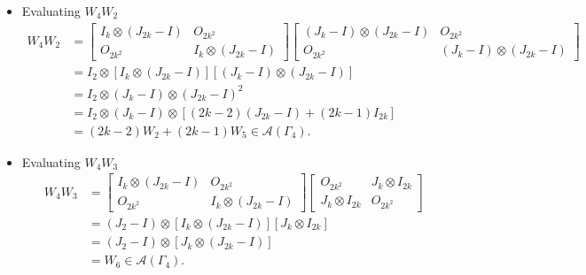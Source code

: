 \begin{itemize}
    \item Evaluating \( W_4 W_2 \)
    \begin{align*}
        W_4W_2
        &=\begin{bmatrix}
            I_{k} \otimes (J_{2k} - I) & O_{2k^2} \\
            O_{2k^2} & I_{k} \otimes (J_{2k} - I)
        \end{bmatrix}\begin{bmatrix}
            (J_k -I) \otimes (J_{2k} -I) & O_{2k^2}\\
            O_{2k^2} & (J_k -I) \otimes (J_{2k} -I)
        \end{bmatrix}\\
        &= I_2\otimes [I_{k} \otimes (J_{2k} - I)][(J_k -I) \otimes (J_{2k} -I)]\\
        &= I_2\otimes (J_k -I) \otimes (J_{2k} - I)^2\\
        &= I_2\otimes (J_k -I) \otimes [(2k-2)(J_{2k}-I) + (2k-1)I_{2k}]\\
        &= (2k-2)W_2 + (2k-1)W_5\in\mathcal{A}(\Gamma_4).
    \end{align*}
    
    \item Evaluating \( W_4 W_3 \)
    \begin{align*}
        W_4W_3
        &=\begin{bmatrix}
            I_{k} \otimes (J_{2k} - I) & O_{2k^2} \\
            O_{2k^2} & I_{k} \otimes (J_{2k} - I)
        \end{bmatrix}\begin{bmatrix}
            O_{2k^2} & J_k \otimes I_{2k} \\
            J_k \otimes I_{2k} & O_{2k^2}
        \end{bmatrix}\\
        &= (J_2-I)\otimes [I_{k} \otimes (J_{2k} - I)][J_k \otimes I_{2k}]\\
        &= (J_2-I)\otimes [J_k \otimes (J_{2k} - I)]\\
        &= W_6 \in \mathcal{A}(\Gamma_4).
    \end{align*}
    

\end{itemize}
